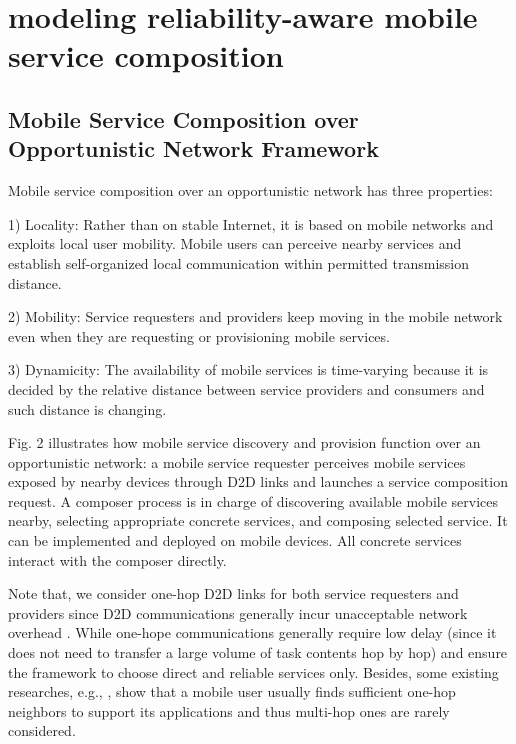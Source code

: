 \documentclass[journal]{IEEEtran}
\begin{document}
\section{modeling reliability-aware mobile service composition}

\subsection{Mobile Service Composition over Opportunistic Network Framework}

Mobile service composition over an opportunistic network has three properties:

1) Locality: Rather than on stable Internet, it is based on mobile networks and exploits local user mobility. Mobile users can perceive nearby services and establish self-organized local communication within permitted transmission distance.

2) Mobility: Service requesters and providers keep moving in the mobile network even when they are requesting or provisioning mobile services.

3) Dynamicity: The availability of mobile services is time-varying because it is decided by the relative distance between service providers and consumers and such distance is changing.

Fig. 2 illustrates how mobile service discovery and provision function over an opportunistic network: a mobile service requester perceives mobile services exposed by nearby devices through D2D links and launches a service composition request. A composer process is in charge of discovering available mobile services nearby, selecting appropriate concrete services, and composing selected service. It can be implemented and deployed on mobile devices. All concrete services interact with the composer directly.

Note that, we consider one-hop D2D links for both service requesters and providers since D2D communications generally incur unacceptable network overhead \cite{li2014can}. While one-hope communications generally require low delay (since it does not need to transfer a large volume of task contents hop by hop) and ensure the framework to choose direct and reliable services only.
Besides, some existing researches, e.g., \cite{chang2015progressive, tuncay2013participant, wu2013homing, jiang2016exploiting, liu2013exploring}, show that a mobile user usually finds sufficient one-hop neighbors to support its applications and thus multi-hop ones are rarely considered.
\end{document}
